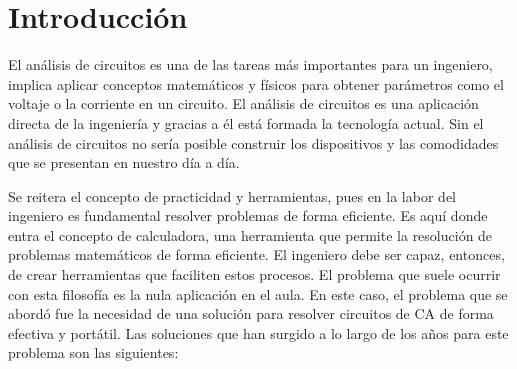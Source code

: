 \documentclass[12pt,a4paper]{article}
\begin{document}
\section{Introducción}
El análisis de circuitos es una de las tareas más importantes para un ingeniero, implica aplicar conceptos matemáticos y físicos para obtener parámetros como el voltaje o la corriente en un circuito. El análisis de circuitos es una aplicación directa de la ingeniería y gracias a él está formada la tecnología actual. Sin el análisis de circuitos no sería posible construir los dispositivos y las comodidades que se presentan en nuestro día a día. \\

Se reitera el concepto de practicidad y herramientas, pues en la labor del ingeniero es fundamental resolver problemas de forma eficiente. Es aquí donde entra el concepto de calculadora, una herramienta que permite la resolución de problemas matemáticos de forma eficiente. El ingeniero debe ser capaz, entonces, de crear herramientas que faciliten estos procesos. El problema que suele ocurrir con esta filosofía es la nula aplicación en el aula. En este caso, el problema que se abordó fue la necesidad de una solución para resolver circuitos de CA de forma efectiva y portátil. Las soluciones que han surgido a lo largo de los años para este problema son las siguientes:
\end{document}
